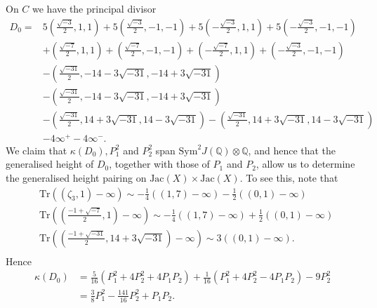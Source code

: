\documentclass[11pt]{amsart}
\def\Q{\mathbb Q}
\newcommand{\Tr}{\mathrm{Tr}}
\newcommand{\Sym}{\mathrm{Sym}}
\theoremstyle{plain}
\theoremstyle{definition}
\newcommand{\Jac}{\mathrm{Jac}}
\begin{document}
On $C$ we have the principal divisor
\begin{align*}
D_0 = & 5(\frac{\sqrt{-3}}{2},1,1)+5(\frac{\sqrt{-3}}{2},-1,-1)+5(-\frac{\sqrt{-3}}{2},1,1)+5(-\frac{\sqrt{-3}}{2},-1,-1) \\
& +(\frac{\sqrt{-7}}{2},1,1)+(\frac{\sqrt{-7}}{2},-1,-1)+(-\frac{\sqrt{-7}}{2},1,1)+(-\frac{\sqrt{-3}}{2},-1,-1) \\
& -(\frac{\sqrt{-31}}{2},-14-3\sqrt{-31},-14+3\sqrt{-31}) \\
& -(\frac{\sqrt{-31}}{2},-14-3\sqrt{-31},-14+3\sqrt{-31}) \\
& -(\frac{\sqrt{-31}}{2},14+3\sqrt{-31},14-3\sqrt{-31})-(\frac{\sqrt{-31}}{2},14+3\sqrt{-31},14-3\sqrt{-31}) \\
& - 4\infty ^+ -4\infty ^- .
\end{align*}
We claim that $\kappa (D_0 ),P_1 ^2$ and $P_2 ^2 $ span $\Sym ^2 J(\Q )\otimes \Q $, and hence that the generalised height of $D_0 $, together with those of $P_1 $ and $P_2$, allow us to determine the generalised height pairing on $\Jac (X)\times \Jac (X)$.
To see this, note that
\begin{align*}
&\Tr ((\zeta _3 ,1)-\infty )\sim -\frac{1}{4}((1,7)-\infty )-\frac{1}{2}((0,1)-\infty ) \\
&\Tr ((\frac{-1+\sqrt{-7}}{2},1)-\infty )\sim -\frac{1}{4}((1,7)-\infty )+\frac{1}{2}((0,1)-\infty ) \\
&\Tr ((\frac{-1+\sqrt{-31}}{2},14+3\sqrt{-31})-\infty )\sim  3((0,1)-\infty ) . \\
\end{align*}
Hence
\begin{align*}
\kappa (D_0 ) & =\frac{5}{16}(P_1 ^2 +4P_2 ^2 +4P_1 P_2 )+\frac{1}{16}(P_1 ^2 +4P_2 ^2 -4P_1 P_2 )-9P_2 ^2 \\
& = \frac{3}{8}P_1 ^2 -\frac{141}{16}P_2 ^2 +P_1 P_2 .
\end{align*}
\end{document}
